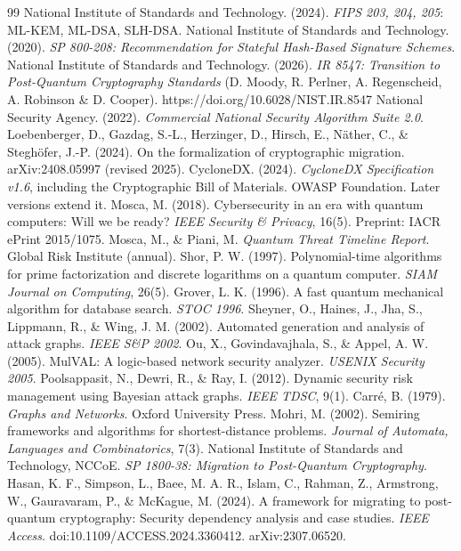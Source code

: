 \documentclass[conference]{IEEEtran}
\begin{document}
\begin{thebibliography}{99}
 National Institute of Standards and Technology. (2024). \emph{FIPS 203, 204, 205}: ML-KEM, ML-DSA, SLH-DSA.
 National Institute of Standards and Technology. (2020). \emph{SP 800-208: Recommendation for Stateful Hash-Based Signature Schemes}.
 National Institute of Standards and Technology. (2026). \emph{IR 8547: Transition to Post-Quantum Cryptography Standards} (D. Moody, R. Perlner, A. Regenscheid, A. Robinson \& D. Cooper). https://doi.org/10.6028/NIST.IR.8547
 National Security Agency. (2022). \emph{Commercial National Security Algorithm Suite 2.0}.
 Loebenberger, D., Gazdag, S.-L., Herzinger, D., Hirsch, E., Näther, C., \& Steghöfer, J.-P. (2024). On the formalization of cryptographic migration. arXiv:2408.05997 (revised 2025).
 CycloneDX. (2024). \emph{CycloneDX Specification v1.6}, including the Cryptographic Bill of Materials. OWASP Foundation. Later versions extend it.
 Mosca, M. (2018). Cybersecurity in an era with quantum computers: Will we be ready? \emph{IEEE Security \& Privacy}, 16(5). Preprint: IACR ePrint 2015/1075.
 Mosca, M., \& Piani, M. \emph{Quantum Threat Timeline Report}. Global Risk Institute (annual).
 Shor, P. W. (1997). Polynomial-time algorithms for prime factorization and discrete logarithms on a quantum computer. \emph{SIAM Journal on Computing}, 26(5).
 Grover, L. K. (1996). A fast quantum mechanical algorithm for database search. \emph{STOC 1996}.
 Sheyner, O., Haines, J., Jha, S., Lippmann, R., \& Wing, J. M. (2002). Automated generation and analysis of attack graphs. \emph{IEEE S\&P 2002}.
 Ou, X., Govindavajhala, S., \& Appel, A. W. (2005). MulVAL: A logic-based network security analyzer. \emph{USENIX Security 2005}.
 Poolsappasit, N., Dewri, R., \& Ray, I. (2012). Dynamic security risk management using Bayesian attack graphs. \emph{IEEE TDSC}, 9(1).
 Carré, B. (1979). \emph{Graphs and Networks}. Oxford University Press.
 Mohri, M. (2002). Semiring frameworks and algorithms for shortest-distance problems. \emph{Journal of Automata, Languages and Combinatorics}, 7(3).
 National Institute of Standards and Technology, NCCoE. \emph{SP 1800-38: Migration to Post-Quantum Cryptography}.
 Hasan, K. F., Simpson, L., Baee, M. A. R., Islam, C., Rahman, Z., Armstrong, W., Gauravaram, P., \& McKague, M. (2024). A framework for migrating to post-quantum cryptography: Security dependency analysis and case studies. \emph{IEEE Access}. doi:10.1109/ACCESS.2024.3360412. arXiv:2307.06520.

\end{thebibliography}
\end{document}
